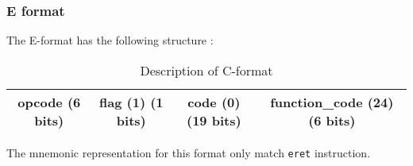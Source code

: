 \subsubsection*{E format}

	The E-format has the following structure :
	\begin{table}[H]
		\centering
		\begin{tabular}{|c|c|c|c|}
		\hline 
		opcode (6 bits) & flag (1) (1 bits) & code (0) (19 bits) & function\_code (24) (6 bits) \\ 
		\hline 
		\end{tabular} 
		\caption{Description of C-format}
	\end{table}
	
	The mnemonic representation for this format only match \verb?eret? instruction.